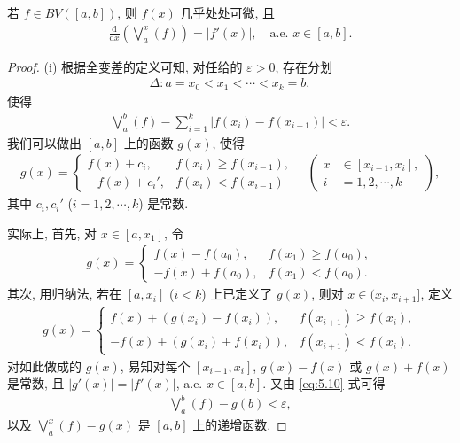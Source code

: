 \documentclass[../../main.tex]{subfiles}%
\begin{document}
\begin{proposition}\label{proposition:有界变差函数必几乎处处可微}
若 $f\in BV([a,b])$, 则 $f(x)$ 几乎处处可微, 且
\begin{align*}
\frac{\mathrm{d}}{\mathrm{d}x}\left(\bigvee_a^x(f)\right) = |f'(x)|, \quad \text{a.e. } x\in[a,b].
\end{align*}
\end{proposition}
\begin{proof}
(i) 根据全变差的定义可知, 对任给的 $\varepsilon>0$, 存在分划
\begin{align*}
\Delta: a = x_0 < x_1 < \cdots < x_k = b,
\end{align*}
使得
\begin{align}
\bigvee_a^b(f) - \sum_{i=1}^k |f(x_i)-f(x_{i-1})| < \varepsilon. \label{eq:5.10}
\end{align}
我们可以做出 $[a,b]$ 上的函数 $g(x)$, 使得
\begin{align*}
g(x) =
\begin{cases}
f(x)+c_i, & f(x_i)\geqslant f(x_{i-1}), \\
-f(x)+c_i', & f(x_i)<f(x_{i-1})
\end{cases}
\quad \left(
\begin{aligned}
x&\in[x_{i-1},x_i], \\
i&=1,2,\cdots,k
\end{aligned}
\right),
\end{align*}
其中 $c_i,c_i'$ ($i=1,2,\cdots,k$) 是常数.

实际上, 首先, 对 $x\in[a,x_1]$, 令
\begin{align*}
g(x) =
\begin{cases}
f(x)-f(a_0), & f(x_1)\geqslant f(a_0), \\
-f(x)+f(a_0), & f(x_1)<f(a_0).
\end{cases}
\end{align*}
其次, 用归纳法, 若在 $[a,x_i]$ ($i<k$) 上已定义了 $g(x)$, 则对 $x\in(x_i,x_{i+1}]$, 定义
\begin{align*}
g(x) =
\begin{cases}
f(x)+(g(x_i)-f(x_i)), & f(x_{i+1})\geqslant f(x_i), \\
-f(x)+(g(x_i)+f(x_i)), & f(x_{i+1})<f(x_i).
\end{cases}
\end{align*}
对如此做成的 $g(x)$, 易知对每个 $[x_{i-1},x_i]$, $g(x)-f(x)$ 或 $g(x)+f(x)$ 是常数, 且 $|g'(x)|=|f'(x)|$, a.e. $x\in[a,b]$. 又由 \eqref{eq:5.10} 式可得
\begin{align*}
\bigvee_a^b(f) - g(b) < \varepsilon,
\end{align*}
以及 $\bigvee_a^x(f)-g(x)$ 是 $[a,b]$ 上的递增函数.


\end{proof}
\end{document}
